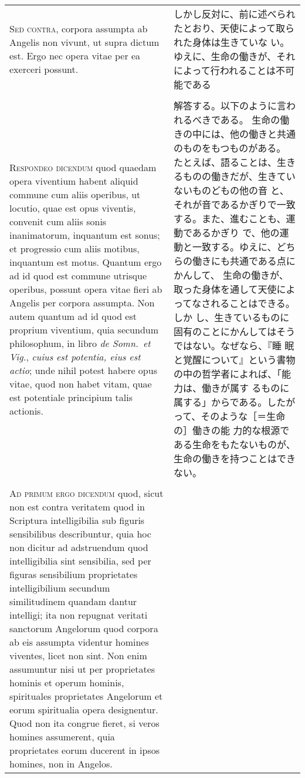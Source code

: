 \documentclass[10pt]{jsarticle} %
\begin{document}
\begin{longtable}{p{21em}p{21em}}
{\scshape Sed contra}, corpora assumpta ab Angelis non
vivunt, ut supra dictum est. Ergo nec opera vitae per ea exerceri
possunt.
&

しかし反対に、前に述べられたとおり、天使によって取られた身体は生きていな
 い。ゆえに、生命の働きが、それによって行われることは不可能である
\\\\



{\scshape Respondeo dicendum} quod quaedam opera viventium habent
aliquid commune cum aliis operibus, ut locutio, quae est opus viventis,
convenit cum aliis sonis inanimatorum, inquantum est sonus; et
progressio cum aliis motibus, inquantum est motus. Quantum ergo ad id
quod est commune utrisque operibus, possunt opera vitae fieri ab Angelis
per corpora assumpta. Non autem quantum ad id quod est proprium
viventium, quia secundum philosophum, in libro {\itshape de Somn.~et
Vig.}, {\itshape cuius est potentia, eius est actio}; unde nihil potest
habere opus vitae, quod non habet vitam, quae est potentiale principium
talis actionis. 

&

解答する。以下のように言われるべきである。
生命の働きの中には、他の働きと共通のものをもつものがある。
たとえば、語ることは、生きるものの働きだが、生きていないものどもの他の音
 と、それが音であるかぎりで一致する。また、進むことも、運動であるかぎり
 で、他の運動と一致する。ゆえに、どちらの働きにも共通である点にかんして、
 生命の働きが、取った身体を通して天使によってなされることはできる。しか
 し、生きているものに固有のことにかんしてはそうではない。なぜなら、『睡
 眠と覚醒について』という書物の中の哲学者によれば、「能力は、働きが属す
 るものに属する」からである。したがって、そのような［＝生命の］働きの能
 力的な根源である生命をもたないものが、生命の働きを持つことはできない。


\\\\



{\scshape Ad primum ergo dicendum} quod, sicut non est
contra veritatem quod in Scriptura intelligibilia sub figuris
sensibilibus describuntur, quia hoc non dicitur ad adstruendum quod
intelligibilia sint sensibilia, sed per figuras sensibilium proprietates
intelligibilium secundum similitudinem quandam dantur intelligi; ita non
repugnat veritati sanctorum Angelorum quod corpora ab eis assumpta
videntur homines viventes, licet non sint. Non enim assumuntur nisi ut
per proprietates hominis et operum hominis, spirituales proprietates
Angelorum et eorum spiritualia opera designentur. Quod non ita congrue
fieret, si veros homines assumerent, quia proprietates eorum ducerent in
ipsos homines, non in Angelos.


\end{longtable}
\end{document}
